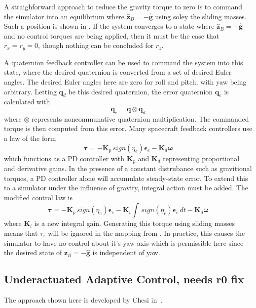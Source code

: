A straighforward approach to reduce the gravity torque to zero is to command the simulator into an equilibrium where $\hat{\bm{z}}_B=-\hat{\bm{g}}$ using soley the sliding masses. Such a position is shown in . If the system converges to a state where $\hat{\bm{z}}_B=-\hat{\bm{g}}$ and no control torques are being applied, then it must be the case that $r_x=r_y=0$, though nothing can be concluded for $r_z$.

A quaternion feedback controller can be used to command the system into this state, where the desired quaternion is converted from a set of desired Euler angles. The desired Euler angles here are zero for roll and pitch, with yaw being arbitrary. Letting $\bm{q}_d$ be this desired quaternion, the error quaternion $\bm{q}_e$ is calculated with
\begin{equation}
    \bm{q}_e = \bm{q}\otimes\bm{q}_d
\end{equation}
where $\otimes$ represents noncommunative quaternion multiplication. The commanded torque is then computed from this error. Many spacecraft feedback controllers use a law of the form
\begin{equation}
    \bm{\tau} = -\bm{K}_p\,sign(\eta_e)\bm{\epsilon}_e-\bm{K}_d\bm{\omega}
\end{equation}
which functions as a PD controller with $\bm{K}_p$ and $\bm{K}_d$ representing proportional and derivative gains. In the presence of a constant distrubance such as gravitional torques, a PD controller alone will accumulate steady-state error. To extend this to a simulator under the influence of gravity, integral action must be added. The modified control law is
\begin{equation}
    \bm{\tau} = -\bm{K}_p\,sign(\eta_e)\bm{\epsilon}_e
    -\bm{K}_i\int\,sign(\eta_e)\bm{\epsilon}_e\,dt
    -\bm{K}_d\bm{\omega}
\end{equation}
where $\bm{K}_i$ is a new integral gain. Generating this torque using sliding masses means that $\tau_z$ will be ignored in the mapping from . In practice, this causes the simulator to have no control about it's yaw axis which is permissible here since the desired state of ${\bm{z}}_B=-\hat{\bm{g}}$ is independent of yaw. 

\subsection{Underactuated Adaptive Control, needs r0 fix}\label{sec:under_adaptive}
The approach shown here is developed by Chesi in~\cite{chesi_automatic_2014}.

